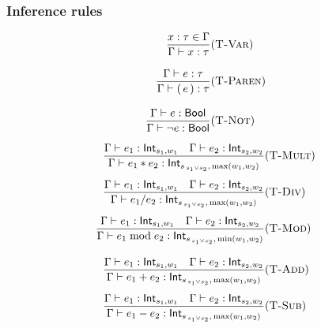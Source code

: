 \subsubsection*{Inference rules}
\begin{multicols}{2}

  \[
    \begin{aligned}
      \frac{x:\tau\in\Gamma}{\Gamma \vdash x : \tau}
       & (\textsc{T-Var})   \\[2ex]
      \frac{\Gamma \vdash e : \tau}{\Gamma \vdash (\,e\,) : \tau}
       & (\textsc{T-Paren}) \\[2ex]
      \frac{\Gamma \vdash e : \mathsf{Bool}}
      {\Gamma \vdash \neg e : \mathsf{Bool}}
       & (\textsc{T-Not})
    \end{aligned}
  \]

  \[
    \begin{aligned}
      \frac{\Gamma \vdash e_1 : \mathsf{Int}_{s_1,w_1}
      \quad
      \Gamma \vdash e_2 : \mathsf{Int}_{s_2,w_2}}
      {\Gamma \vdash e_1 * e_2 : \mathsf{Int}_{s_{\,s_1\lor s_2},\,\max(w_1, w_2)}}
       & (\textsc{T-Mult}) \\[1ex]
      \frac{\Gamma \vdash e_1 : \mathsf{Int}_{s_1,w_1}
      \quad
      \Gamma \vdash e_2 : \mathsf{Int}_{s_2,w_2}}
      {\Gamma \vdash e_1 / e_2 : \mathsf{Int}_{s_{\,s_1\lor s_2},\,\max(w_1, w_2)}}
       & (\textsc{T-Div})  \\[1ex]
      \frac{\Gamma \vdash e_1 : \mathsf{Int}_{s_1,w_1}
      \quad
      \Gamma \vdash e_2 : \mathsf{Int}_{s_2,w_2}}
      {\Gamma \vdash e_1 \bmod e_2 : \mathsf{Int}_{s_{\,s_1\lor s_2},\,\min(w_1, w_2)}}
       & (\textsc{T-Mod})  \\[2ex]
      \frac{\Gamma \vdash e_1 : \mathsf{Int}_{s_1,w_1}
      \quad
      \Gamma \vdash e_2 : \mathsf{Int}_{s_2,w_2}}
      {\Gamma \vdash e_1 + e_2 : \mathsf{Int}_{s_{\,s_1\lor s_2},\,\max(w_1, w_2)}}
       & (\textsc{T-Add})  \\[1ex]
      \frac{\Gamma \vdash e_1 : \mathsf{Int}_{s_1,w_1}
      \quad
      \Gamma \vdash e_2 : \mathsf{Int}_{s_2,w_2}}
      {\Gamma \vdash e_1 - e_2 : \mathsf{Int}_{s_{\,s_1\lor s_2},\,\max(w_1, w_2)}}
       & (\textsc{T-Sub})
    \end{aligned}
  \]


\end{multicols}
